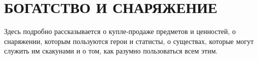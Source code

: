 \chapter{БОГАТСТВО И СНАРЯЖЕНИЕ}
Здесь подробно рассказывается о купле-продаже предметов и ценностей, о снаряжении, которым пользуются герои и статисты, о существах, которые могут служить им скакунами и о том, как разумно пользоваться всем этим.









